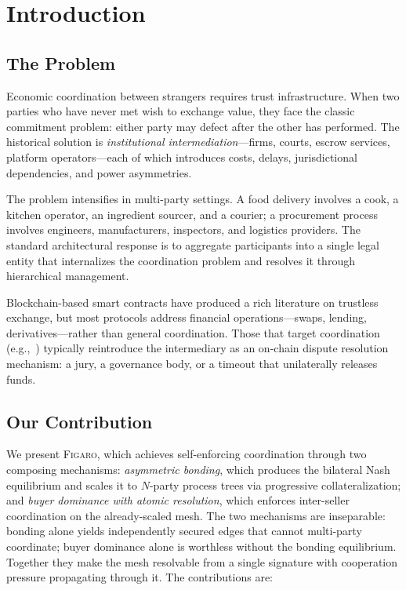 \documentclass[11pt,a4paper]{article}
\theoremstyle{definition}
\theoremstyle{remark}
\newcommand{\figaro}{\textsc{Figaro}}
\begin{document}
\section{Introduction}
\label{sec:intro}

\subsection{The Problem}

Economic coordination between strangers requires trust infrastructure.
When two parties who have never met wish to exchange value, they face
the classic commitment problem: either party may defect after the
other has performed. The historical solution is \emph{institutional
intermediation}---firms, courts, escrow services, platform
operators---each of which introduces costs, delays, jurisdictional
dependencies, and power asymmetries.

The problem intensifies in multi-party settings. A food delivery
involves a cook, a kitchen operator, an ingredient sourcer, and a
courier; a procurement process involves engineers, manufacturers,
inspectors, and logistics providers. The standard architectural
response is to aggregate participants into a single legal entity that
internalizes the coordination problem and resolves it through
hierarchical management.

Blockchain-based smart contracts have produced a rich literature on
trustless exchange, but most protocols address financial
operations---swaps, lending, derivatives---rather than general
coordination. Those that target coordination
(e.g.,~\citealt{kleros2019,aragon2017}) typically reintroduce the
intermediary as an on-chain dispute resolution mechanism: a jury, a
governance body, or a timeout that unilaterally releases funds.

\subsection{Our Contribution}

We present \figaro{}, which achieves self-enforcing coordination
through two composing mechanisms: \emph{asymmetric bonding}, which
produces the bilateral Nash equilibrium and scales it to $N$-party
process trees via progressive collateralization; and \emph{buyer
dominance with atomic resolution}, which enforces inter-seller
coordination on the already-scaled mesh. The two mechanisms are
inseparable: bonding alone yields independently secured edges that
cannot multi-party coordinate; buyer dominance alone is worthless
without the bonding equilibrium. Together they make the mesh
resolvable from a single signature with cooperation pressure
propagating through it. The contributions are:
\end{document}
